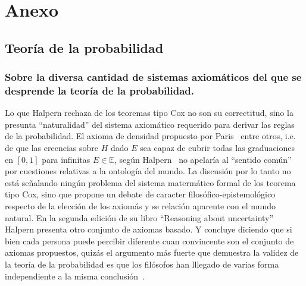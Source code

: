 \documentclass[a4paper,10pt]{book}
\begin{document}
\newpage

{\footnotesize

%


}

\chapter{Anexo}

\section{Teoría de la probabilidad}

\subsection{Sobre la diversa cantidad de sistemas axiomáticos del que se desprende la teoría de la probabilidad.}

Lo que Halpern rechaza de los teoremas tipo Cox no son su correctitud, sino la presunta ``naturalidad'' del sistema axiomático requerido para derivar las reglas de la probabilidad.
El axioma de densidad propuesto por Paris~\cite{paris1994} entre otros, i.e. de que las creencias sobre $H$ dado $E$ sea capaz de cubrir todas las graduaciones en $[0,1]$ para infinitas $E \in \mathbb{E}$, según Halpern~\cite{halpern1999-coxTheoremRevisited} no apelaría al ``sentido común'' por cuestiones relativas a la ontología del mundo.%
La discusión por lo tanto no está señalando ningún problema del sistema matermático formal de los teorema tipo Cox, sino que propone un debate de caracter filosófico-epistemológico respecto de la elección de los axiomás y se relación aparente con el mundo natural.
En la segunda edición de su libro ``Reasoning about uncertainty'' Halpern presenta otro conjunto de axiomas basado.
Y concluye diciendo que si bien cada persona puede percibir diferente cuan convincente son el conjunto de axiomas propuestos, quizás el argumento más fuerte que demuestra la validez de la teoría de la probabilidad es que los filósofos han lllegado de varias forma independiente a la misma conclusión~\cite{halpern2017-RAU2}.
\end{document}
